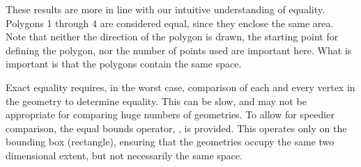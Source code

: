 \documentclass[a4paper,11pt,english]{sphinxmanual}
\begin{document}
\begin{sphinxVerbatim}[commandchars=\\\{\}]
        
        
        
        
        
        
        
        
        
        
        
        
        
\end{sphinxVerbatim}

These results are more in line with our intuitive understanding of equality.  Polygons 1 through 4 are considered equal, since they enclose the same area.  Note that neither the direction of the polygon is drawn, the starting point for defining the polygon, nor the number of points used are important here.  What is important is that the polygons contain the same space.

Exact equality requires, in the worst case, comparison of each and every vertex in the geometry to determine equality.  This can be slow, and may not be appropriate for comparing huge numbers of geometries.  To allow for speedier comparison, the equal bounds operator, \sphinxstyleliteralstrong{\sphinxupquote{=}}, is provided.  This operates only on the bounding box (rectangle), ensuring that the geometries occupy the same two dimensional extent, but not necessarily the same space.
\end{document}

